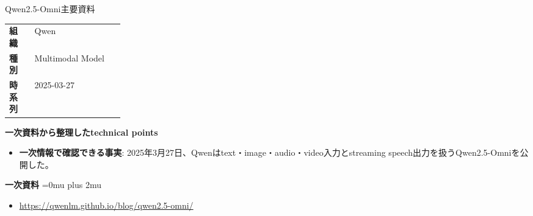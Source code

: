 \begin{technicalnote}{Qwen2.5-Omni}{主要資料}
\begingroup
\begin{tabularx}{\linewidth}{@{}>{\bfseries}p{0.22\linewidth}X@{}}
組織 & Qwen \\
種別 & Multimodal Model \\
時系列 & 2025-03-27 \\
\end{tabularx}
\smallskip
\begin{minipage}{\linewidth}
{\bfseries 一次資料から整理したtechnical points}
\begin{itemize}[leftmargin=1.5em,itemsep=0.35em]
\item \textbf{一次情報で確認できる事実}: 2025年3月27日、Qwenはtext・image・audio・video入力とstreaming speech出力を扱うQwen2.5-Omniを公開した。
\end{itemize}
\begin{samepage}
{\bfseries 一次資料}
\begingroup\sloppy
\Urlmuskip=0mu plus 2mu\relax
\begin{itemize}[leftmargin=1.5em,itemsep=0.25em]
\item {\scriptsize\url{https://qwenlm.github.io/blog/qwen2.5-omni/}}
\end{itemize}
\endgroup
\end{samepage}
\end{minipage}
\endgroup
\end{technicalnote}
\medskip

